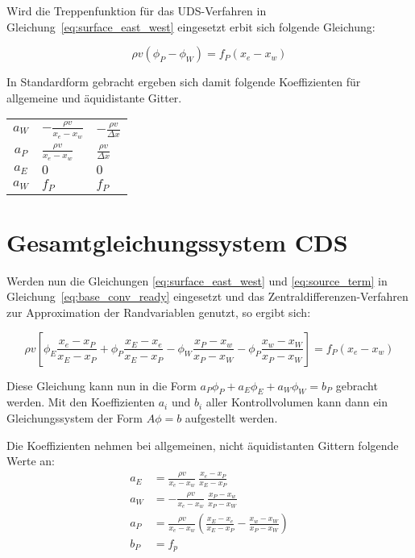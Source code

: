 \documentclass[11pt, ngerman,colorback,accentcolor=tud2d]{tudreport}
\begin{document}
Wird die Treppenfunktion für das UDS-Verfahren in Gleichung~\eqref{eq:surface_east_west}
eingesetzt erbit sich folgende Gleichung:

\begin{equation}
  \rho v (\phi_P - \phi_W) = f_P(x_e-x_w)
\end{equation}

In Standardform gebracht ergeben sich damit folgende Koeffizienten für allgemeine
und äquidistante Gitter.

\begin{tabular}{cll}
  $a_W$ & $-\frac{\rho v}{x_e-x_w}$ & $-\frac{\rho v}{\Delta x}$ \\
  $a_P$ & $\frac{\rho v}{x_e-x_w}$ & $\frac{\rho v}{\Delta x}$ \\
  $a_E$ & $0$ & $0$ \\
  $a_W$ & $f_P$ & $f_P$ \\
\end{tabular}

\section{Gesamtgleichungssystem CDS}

Werden nun die Gleichungen \eqref{eq:surface_east_west} und \eqref{eq:source_term}
in Gleichung~\eqref{eq:base_conv_ready} eingesetzt und das Zentraldifferenzen-Verfahren
zur Approximation der Randvariablen genutzt, so ergibt sich:

\begin{equation*}
  \rho v \left[{\phi_E \frac{x_e-x_P}{x_E-x_P} + \phi_P \frac{x_E-x_e}{x_E-x_P}
  -\phi_W \frac{x_P-x_w}{x_P-x_W} - \phi_P \frac{x_w-x_W}{x_P-x_W}
  }\right]
  = f_P(x_e-x_w)
\end{equation*}

Diese Gleichung kann nun in die Form $a_P \phi_P + a_E \phi_E + a_W \phi_W = b_P$
gebracht werden. Mit den Koeffizienten $a_i$ und $b_i$ aller Kontrollvolumen kann
dann ein Gleichungssystem der Form $A\phi = b$ aufgestellt werden.

Die Koeffizienten nehmen bei allgemeinen, nicht äquidistanten Gittern folgende Werte
an:
\begin{align*}
  a_E &= \frac{\rho v}{x_e-x_w}\ \frac{x_e-x_P}{x_E-x_P}\\
  a_W &=-\frac{\rho v}{x_e-x_w}\ \frac{x_P-x_w}{x_P-x_W}\\
  a_P &= \frac{\rho v}{x_e-x_w} \left({\frac{x_E-x_e}{x_E-x_P}
-\frac{x_w-x_W}{x_P-x_W}}\right)\\
  b_P &= f_p
\end{align*}
\end{document}
